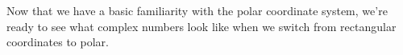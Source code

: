 


Now that we have a basic familiarity with the polar coordinate system, we're ready to see what complex numbers look like when we switch from rectangular coordinates to polar.

